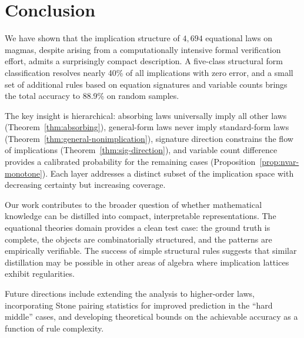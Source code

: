\section{Conclusion}\label{sec:conclusion}

We have shown that the implication structure of $4{,}694$ equational laws on
magmas, despite arising from a computationally intensive formal verification
effort, admits a surprisingly compact description.  A five-class structural
form classification resolves nearly 40\% of all implications with zero error,
and a small set of additional rules based on equation signatures and variable
counts brings the total accuracy to 88.9\% on random samples.

The key insight is hierarchical: absorbing laws universally imply all other
laws (Theorem~\ref{thm:absorbing}), general-form laws never imply standard-form
laws (Theorem~\ref{thm:general-nonimplication}), signature direction constrains
the flow of implications (Theorem~\ref{thm:sig-direction}), and variable count
difference provides a calibrated probability for the remaining cases
(Proposition~\ref{prop:nvar-monotone}).  Each layer addresses a distinct subset
of the implication space with decreasing certainty but increasing coverage.

Our work contributes to the broader question of whether mathematical knowledge
can be distilled into compact, interpretable representations.  The equational
theories domain provides a clean test case: the ground truth is complete, the
objects are combinatorially structured, and the patterns are empirically
verifiable.  The success of simple structural rules suggests that similar
distillation may be possible in other areas of algebra where implication
lattices exhibit regularities.

Future directions include extending the analysis to higher-order laws,
incorporating Stone pairing statistics for improved prediction in the ``hard
middle'' cases, and developing theoretical bounds on the achievable accuracy
as a function of rule complexity.
